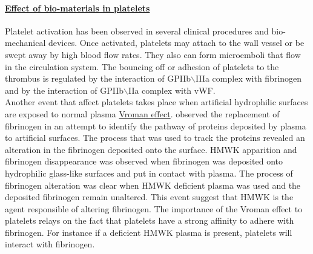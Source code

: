 \documentclass[%
 nofootinbib,
 amsmath,amssymb,
 aps,
 pra,
]{revtex4-1}
\begin{document}
\paragraph{\underline{Effect of bio-materials in platelets}}
Platelet activation has been observed in several clinical procedures and bio-mechanical devices. Once activated, platelets may attach to the wall vessel or be swept away by high blood flow rates. They also can form microemboli that flow in the circulation system. The bouncing off or adhesion of platelets to the thrombus is regulated by the interaction of GPIIb$\backslash$IIIa complex with fibrinogen and by the interaction of GPIIb$\backslash$IIa complex with vWF.\\
Another event that affect platelets takes place when artificial hydrophilic surfaces are exposed to normal plasma \underline{Vroman effect}. \citet{Vroman:1980} observed the replacement of fibrinogen in an attempt to identify the pathway of proteins deposited by plasma to artificial surfaces. The process that was used to track the proteins revealed an alteration in the fibrinogen deposited onto the surface. HMWK apparition and fibrinogen disappearance was observed when fibrinogen was deposited onto hydrophilic glass-like surfaces and put in contact with plasma. The process of fibrinogen alteration was clear when HMWK deficient plasma was used and the deposited fibrinogen remain unaltered. This event suggest that HMWK is the agent responsible of altering fibrinogen. The importance of the Vroman effect to platelets relays on the fact that platelets have a strong affinity to adhere with fibrinogen. For instance if a deficient HMWK plasma is present, platelets will interact with fibrinogen. 
\end{document}
